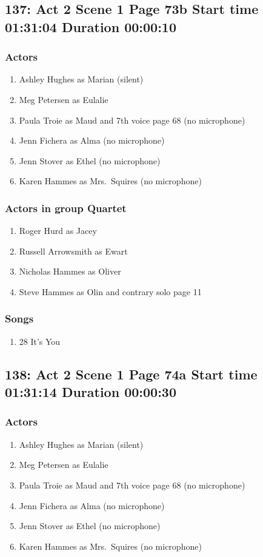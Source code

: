 \subsection{137: Act 2 Scene 1 Page 73b Start time 01:31:04 Duration 00:00:10}

\subsubsection{Actors}
\begin{enumerate}
\item Ashley Hughes as Marian (silent)
\item Meg Petersen as Eulalie
\item Paula Troie as Maud and 7th voice page 68 (no microphone)
\item Jenn Fichera as Alma (no microphone)
\item Jenn Stover as Ethel (no microphone)
\item Karen Hammes as Mrs.~Squires (no microphone)
\end{enumerate}
\subsubsection{Actors in group Quartet}
\begin{enumerate}
\item Roger Hurd as Jacey
\item Russell Arrowsmith as Ewart
\item Nicholas Hammes as Oliver
\item Steve Hammes as Olin and contrary solo page 11
\end{enumerate}

\subsubsection{Songs}
\begin{enumerate}
\item 28 It's You
\end{enumerate}
\subsection{138: Act 2 Scene 1 Page 74a Start time 01:31:14 Duration 00:00:30}

\subsubsection{Actors}
\begin{enumerate}
\item Ashley Hughes as Marian (silent)
\item Meg Petersen as Eulalie
\item Paula Troie as Maud and 7th voice page 68 (no microphone)
\item Jenn Fichera as Alma (no microphone)
\item Jenn Stover as Ethel (no microphone)
\item Karen Hammes as Mrs.~Squires (no microphone)
\end{enumerate}
